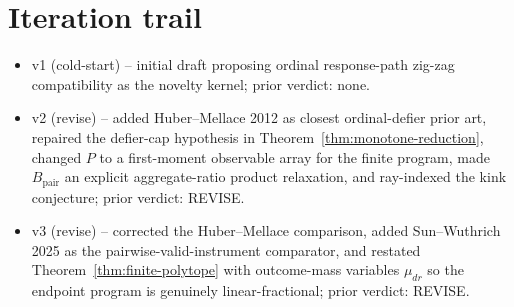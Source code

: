 \documentclass[11pt]{article}
\theoremstyle{definition}
\theoremstyle{plain}
\theoremstyle{remark}
\begin{document}
\section{Iteration trail}
\begin{itemize}[leftmargin=*]
\item v1 (cold-start) -- initial draft proposing ordinal response-path zig-zag compatibility as the novelty kernel; prior verdict: none.
\item v2 (revise) -- added Huber--Mellace 2012 as closest ordinal-defier prior art, repaired the defier-cap hypothesis in Theorem~\ref{thm:monotone-reduction}, changed \(P\) to a first-moment observable array for the finite program, made \(B_{\mathrm{pair}}\) an explicit aggregate-ratio product relaxation, and ray-indexed the kink conjecture; prior verdict: REVISE.
\item v3 (revise) -- corrected the Huber--Mellace comparison, added Sun--Wuthrich 2025 as the pairwise-valid-instrument comparator, and restated Theorem~\ref{thm:finite-polytope} with outcome-mass variables \(\mu_{dr}\) so the endpoint program is genuinely linear-fractional; prior verdict: REVISE.
\end{itemize}
\end{document}
